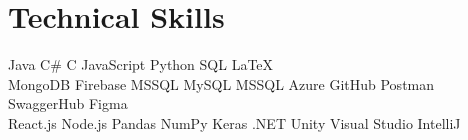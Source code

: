 \documentclass[]{deedy-resume-openfont}
\begin{document}

\section{Technical Skills}

Java \textbullet{}   C\# \textbullet{} C \textbullet{} JavaScript \textbullet{}
Python \textbullet{} SQL \textbullet{} LaTeX \\ 

MongoDB \textbullet{} Firebase \textbullet{} MSSQL \textbullet{} MySQL \textbullet{} MSSQL \textbullet{} Azure \textbullet{} GitHub  
 \textbullet{} Postman \textbullet{} SwaggerHub \textbullet{} Figma\\
React.js \textbullet{} Node.js \textbullet{} Pandas \textbullet{} NumPy
Keras \textbullet{} .NET \textbullet{} Unity \textbullet{} Visual Studio \textbullet{} IntelliJ
\sectionsep

\hfill
\end{document}
